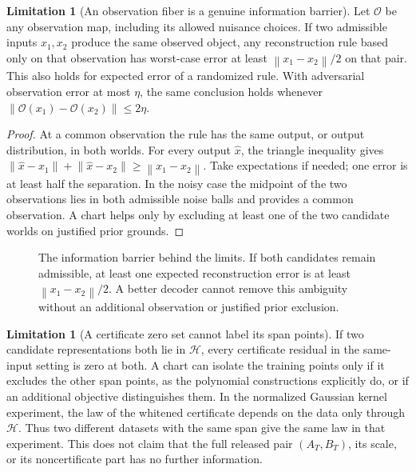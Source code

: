 \documentclass[11pt,a4paper]{article}
\theoremstyle{definition}
\theoremstyle{definition}
\newtheorem{limitation}[theorem]{Limitation}
\theoremstyle{remark}\newtheorem{remark}[theorem]{Remark}
\newcommand{\HH}{\mathcal H}\newcommand{\XX}{\mathcal X}\newcommand{\col}{\operatorname{col}}
\newcommand{\norm}[1]{\left\lVert #1\right\rVert}
\begin{document}
\begin{limitation}[An observation fiber is a genuine information barrier]\label{lim:fiber}
Let $\mathcal O$ be any observation map, including its allowed nuisance choices. If two admissible inputs $x_1,x_2$ produce the same observed object, any reconstruction rule based only on that observation has worst-case error at least $\norm{x_1-x_2}/2$ on that pair. This also holds for expected error of a randomized rule. With adversarial observation error at most $\eta$, the same conclusion holds whenever $\norm{\mathcal O(x_1)-\mathcal O(x_2)}\le2\eta$.
\end{limitation}
\begin{proof}
At a common observation the rule has the same output, or output distribution, in both worlds. For every output $\widehat x$, the triangle inequality gives $\norm{\widehat x-x_1}+\norm{\widehat x-x_2}\ge\norm{x_1-x_2}$. Take expectations if needed; one error is at least half the separation. In the noisy case the midpoint of the two observations lies in both admissible noise balls and provides a common observation. A chart helps only by excluding at least one of the two candidate worlds on justified prior grounds.
\end{proof}

\begin{figure}[htbp]
\centering
{}
\caption{The information barrier behind the limits. If both candidates remain admissible, at least one expected reconstruction error is at least $\norm{x_1-x_2}/2$. A better decoder cannot remove this ambiguity without an additional observation or justified prior exclusion.}
\label{fig:observationfiber}
\end{figure}
\FloatBarrier

\begin{limitation}[A certificate zero set cannot label its span points]
If two candidate representations both lie in $\HH$, every certificate residual in the same-input setting is zero at both. A chart can isolate the training points only if it excludes the other span points, as the polynomial constructions explicitly do, or if an additional objective distinguishes them. In the normalized Gaussian kernel experiment, the law of the whitened certificate depends on the data only through $\HH$. Thus two different datasets with the same span give the same law in that experiment. This does not claim that the full released pair $(A_T,B_T)$, its scale, or its noncertificate part has no further information.
\end{limitation}
\end{document}
